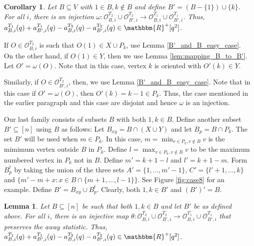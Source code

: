 \documentclass[12pt]{article}
\def\eod{\vrule height 6pt width 5pt depth 0pt}
\newenvironment{proof}{\noindent {\bf Proof:} \hspace{.2em}}
                      {\hspace*{\fill}{\eod}}
\newtheorem{lemma}[theorem]{Lemma}
\newtheorem{corollary}[theorem]{Corollary}
\newcommand{\sO}{  \mathcal{ O}}
\newcommand{\RR}{ \mathbbm{R}}
\begin{document}
\begin{corollary}
  \label{cor:mix_1_and_k}
Let $B \subseteq V$ with $1 \in B, k \not\in B$ and define 
$B' = (B - \{1\}) \cup \{k\}$.  For all
$i$, there is an injection $\omega: \sO_{B,i}^{T_2} \cup \sO_{B',i}^{T_2} \rightarrow
\sO_{B,i}^{T_1} \cup \sO_{B',i}^{T_1}$.
Thus, $a_{B,i}^{T_1}(q) + a_{B',i}^{T_1}(q) - a_{B,i}^{T_2}(q) -
a_{B',i}^{T_2}(q) \in \RR^+[q^2]$.
\end{corollary}
\begin{proof}
If $O \in \sO_{B,i}^{T_2}$ is such that $O(1) \in X \cup P_k$, use Lemma
\ref{B'_and_B_easy_case}. On the other hand,  if $O(1) \in Y$, then 
we use Lemma \ref{lem:mapping_B_to_B'}.  Let $O' = \omega(O)$.
Note that in this case, vertex $k$ is oriented with $O'(k) \in Y$.

Similarly, if $O \in \sO_{B',i}^{T_2}$, then, 
we use Lemma  \ref{B'_and_B_easy_case}.  Note that in this
case if $O' = \omega(O)$, then $O'(k) = k-1 \in P_k$.  Thus,
the case mentioned in the earlier paragraph and this case
are disjoint and hence $\omega$ is an injection.
\end{proof}

\vspace{2 mm}


Our last family consists of subsets $B$ with both $1,k \in B$.  
Define another subset $B' \subseteq [n]$ using $B$ as follows:  
Let $B_{xy} = B\cap (X \cup Y)$ and let $B_p = B \cap P_k$.   
The set $B'$ will be used when $m \in P_k$.  In this case,
$m = \min_{v \in P_k, v \not \in B} v$ is the mimimum
vertex outside $B$ in $P_k$.  
Define $l = \max_{v \in P_k, v \not \in B} v$ to be the maximum
numbered vertex in $P_k$ not in $B$.   Define $m'= k+1-l$ and
$l' = k+1-m$.   Form $B_p^t$ by taking the union of the three
sets $A' = \{1,\ldots, m'-1\}$, $C' =\{l'+1, \ldots, k \}$ and 
$\{m'-m +x : x \in B \cap \{m+1,\ldots,l-1\}  \}$.  See 
Figure \ref{fig:case8} for an example.  
Define $B' = B_{xy} \cup B_p^t$.  Clearly, both 
$1,k \in B'$ and $(B')' = B$.

\begin{lemma}
\label{lem:1_and_k_in_O}
Let $B \subseteq [n]$  be such that both $1,k \in B$ and let $B'$ be as defined
above.  For all $i$, there 
is an injective map $\theta: \sO_{B,i}^{T_2}  \cup \sO_{B',i}^{T_2} \rightarrow 
\sO_{B,i}^{T_1} \cup \sO_{B',i}^{T_1}$ that preserves the
away statistic.
Thus,  $a_{B,i}^{T_1}(q) + a_{B',i}^{T_1}(q) - a_{B,i}^{T_2}(q) -a_{B',i}^{T_2}(q) 
\in \RR^+[q^2]$.
\end{lemma}
\end{document}
